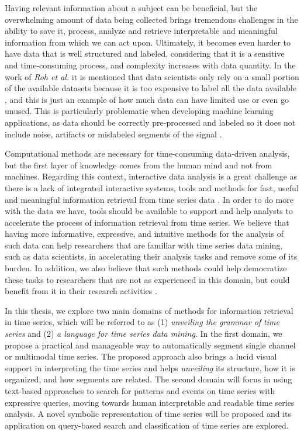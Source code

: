 Having relevant information about a subject can be beneficial, but the overwhelming amount of data being collected brings tremendous challenges in the ability to save it, process, analyze and retrieve interpretable and meaningful information from which we can act upon\cite{bigdata}. Ultimately, it becomes even harder to have data that is well structured and labeled, considering that it is a sensitive and time-consuming process, and complexity increases with data quantity. In the work of \textit{Roh et al.} it is mentioned that data scientists only rely on a small portion of the available datasets because it is too expensive to label all the data available \cite{roh2019survey}, and this is just an example of how much data can have limited use or even go unused. This is particularly problematic when developing machine learning applications, as data should be correctly pre-processed and labeled so it does not include noise, artifacts or mislabeled segments of the signal \cite{roh2019survey}. 

Computational methods are necessary for time-consuming data-driven analysis, but the first layer of knowledge comes from the human mind and not from machines. Regarding this context, interactive data analysis is a great challenge as there is a lack of integrated interactive systems, tools and methods for fast, useful and meaningful information retrieval from time series data \cite{intuition1, intuition2, holzinger, machado2015}. In order to do more with the data we have, tools should be available to support and help analysts to accelerate the process of information retrieval from time series. We believe that having more informative, expressive, and intuitive methods for the analysis of such data can help researchers that are familiar with time series data mining, such as data scientists, in accelerating their analysis tasks and remove some of its burden. In addition, we also believe that such methods could help democratize these tasks to researchers that are not as experienced in this domain, but could benefit from it in their research activities \cite{democratize}.

In this thesis, we explore two main domains of methods for information retrieval in time series, which will be referred to as (1) \textit{unveiling the grammar of time series} and (2) \textit{a language for time series data mining}. In the first domain, we propose a practical and manageable way to automatically segment single channel or multimodal time series. The proposed approach also brings a lucid visual support in interpreting the time series and helps \textit{unveiling} its structure, how it is organized, and how segments are related. The second domain will focus in using text-based approaches to search for patterns and events on time series with expressive queries, moving towards human interpretable and readable time series analysis. A novel symbolic representation of time series will be proposed and its application on query-based search and classification of time series are explored.

